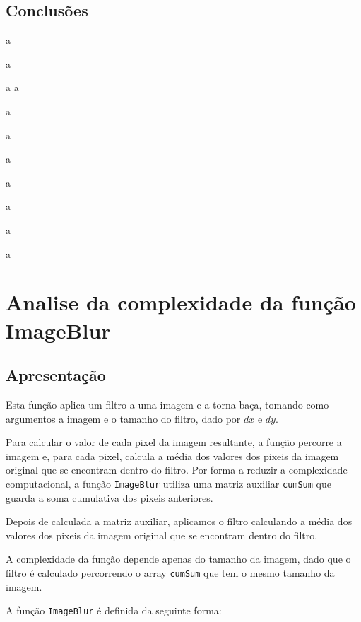 \documentclass{report}
\begin{document}
\subsection{Conclusões}

a

a

a
a

a

a

a

a

a

a

a


\newpage


\section{Analise da complexidade da função ImageBlur}

\subsection{Apresentação}
Esta função aplica um filtro a uma imagem e a torna baça, tomando como argumentos a imagem e o tamanho do filtro, dado por \(dx\) e \(dy\).
\par
Para calcular o valor de cada pixel da imagem resultante, a função percorre a imagem e, para cada pixel,
calcula a média dos valores dos pixeis da imagem original que se encontram dentro do filtro. Por forma a reduzir a complexidade computacional,
a função \texttt{ImageBlur} utiliza uma matriz auxiliar \texttt{cumSum} que guarda a soma cumulativa dos pixeis anteriores.
\par
Depois de calculada a matriz auxiliar, aplicamos o filtro calculando a média dos valores dos pixeis da imagem original que se encontram dentro do filtro.
\par
A complexidade da função depende apenas do tamanho da imagem, dado que o filtro é calculado percorrendo o array \texttt{cumSum} 
que tem o mesmo tamanho da imagem.
\par
A função \texttt{ImageBlur} é definida da seguinte forma:
\end{document}
